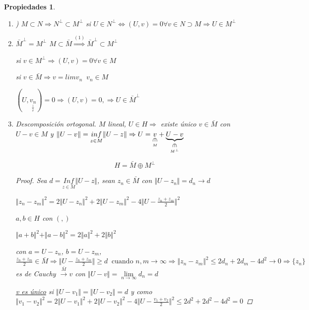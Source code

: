 \documentclass[a4paper,10pt]{book}
\newtheorem{propiedades}{Propiedades}
\newcommand{\rotin}{\mathbin{\rotatebox[origin=c]{270}{$\in$}}}
\begin{document}
\begin{propiedades}
\begin{enumerate}
    \item ) $M\subset N \Rightarrow N^\perp \subset M^\perp$  
    si $U\in N^\perp  \Leftrightarrow  (U,v) =0 \forall v\in N\supset M \Rightarrow U\in M^\perp $
    \item  $\bar{M}^\perp = M^\perp $   $M\subset \bar{M}  \overset{(1)}{\Rightarrow } \bar{M}^\perp \subset M^\perp $
    
    si $v\in M^\perp \Rightarrow (U,v)  = 0 \forall  v \in M$

    si $v\in \bar{M} \Rightarrow  v= lim v_n  \; \; v_n\in M$ 

    $(U, \underset{ \underset{v}{\downarrow}}{v_n})= 0  \Rightarrow (U,v)=0,  \Rightarrow U \in \bar{M}^\perp $

    \item Descomposición ortogonal. $M$ lineal, $U\in H \Rightarrow$ existe único $v\in \bar{M}$ con $U-v\in M $ y $\Vert U -v \Vert =\underset{z\in M}{inf} \Vert U-z \Vert \Rightarrow  U = \underset{\underset{M }{\rotin}}{v} + \underset{\underset{M^\perp }{\rotin}}{\underbrace{U -v}}$ 

    \[H= \bar{M} \oplus  M^{\perp}\]

    \begin{proof}
        Sea $d=\underset{z\in \bar{M}}{Inf}\Vert U-z\Vert$, sean $z_n\in \bar{M}$ con $\Vert U-z_n\Vert = d_n \rightarrow d$

        $\Vert z_n-z_m\Vert^2 = 2 \Vert U-z_n\Vert^2 + 2 \Vert U - z_m\Vert^2 -4 \Vert U-\frac{z_n + z_m}{2}\Vert^2$

        $a,b\in H$ con $(,)$

        $\Vert a+b\Vert^2 + \Vert a - b \Vert^2 = 2\Vert a \Vert^2 + 2 \Vert b \Vert^2 $

        con $a= U-z_n$, $ b= U- z_m$, $\frac{z_n + z_m }{2} \in \bar{M} \Rightarrow \Vert U - \frac{z_n+z_m}{2} \Vert \geq d \;\; \text{cuando }  n,m \rightarrow \infty \Rightarrow \Vert z_n-z_m \Vert^2 \leq 2 d_n + 2 d_m - 4 d^2 \rightarrow 0  \Rightarrow \{z_n\} $ es de Cauchy $\overset{\bar{M}}{\rightarrow} v $ con $\Vert U-v \Vert = \lim\limits_{n\rightarrow \infty } d_n = d$

        \underline{v es único} si $\Vert U-v_1\Vert = \Vert U-v_2\Vert = d$
        y como
        $\Vert v_1-v_2 \Vert^2 = 2 \Vert U- v_1\Vert^2 + 2 \Vert U - v_2\Vert^2 -4\Vert U- \frac{v_1+v_2}{2}\Vert^2 \leq 2 d^2 + 2 d^2 -4d^2 =0 $


\end{proof}
\end{enumerate}
\end{propiedades}
\end{document}
